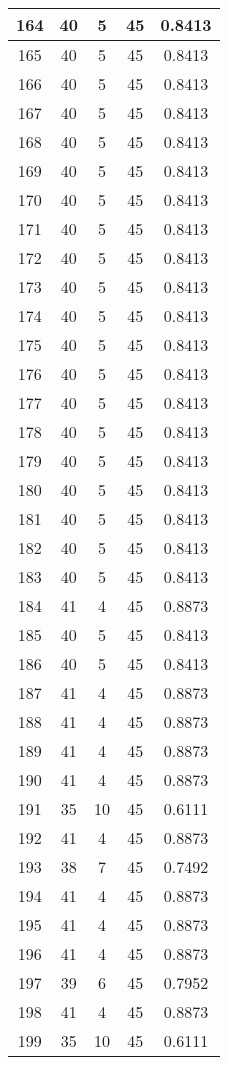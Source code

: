 \documentclass[letterpaper, 12pt]{article}
\begin{document}
\begin{longtable}{|c|c|c|c|c|}
\hline
164 & 40 & 5 & 45 & 0.8413 \\
\hline
165 & 40 & 5 & 45 & 0.8413 \\
\hline
166 & 40 & 5 & 45 & 0.8413 \\
\hline
167 & 40 & 5 & 45 & 0.8413 \\
\hline
168 & 40 & 5 & 45 & 0.8413 \\
\hline
169 & 40 & 5 & 45 & 0.8413 \\
\hline
170 & 40 & 5 & 45 & 0.8413 \\
\hline
171 & 40 & 5 & 45 & 0.8413 \\
\hline
172 & 40 & 5 & 45 & 0.8413 \\
\hline
173 & 40 & 5 & 45 & 0.8413 \\
\hline
174 & 40 & 5 & 45 & 0.8413 \\
\hline
175 & 40 & 5 & 45 & 0.8413 \\
\hline
176 & 40 & 5 & 45 & 0.8413 \\
\hline
177 & 40 & 5 & 45 & 0.8413 \\
\hline
178 & 40 & 5 & 45 & 0.8413 \\
\hline
179 & 40 & 5 & 45 & 0.8413 \\
\hline
180 & 40 & 5 & 45 & 0.8413 \\
\hline
181 & 40 & 5 & 45 & 0.8413 \\
\hline
182 & 40 & 5 & 45 & 0.8413 \\
\hline
183 & 40 & 5 & 45 & 0.8413 \\
\hline
184 & 41 & 4 & 45 & 0.8873 \\
\hline
185 & 40 & 5 & 45 & 0.8413 \\
\hline
186 & 40 & 5 & 45 & 0.8413 \\
\hline
187 & 41 & 4 & 45 & 0.8873 \\
\hline
188 & 41 & 4 & 45 & 0.8873 \\
\hline
189 & 41 & 4 & 45 & 0.8873 \\
\hline
190 & 41 & 4 & 45 & 0.8873 \\
\hline
191 & 35 & 10 & 45 & 0.6111 \\
\hline
192 & 41 & 4 & 45 & 0.8873 \\
\hline
193 & 38 & 7 & 45 & 0.7492 \\
\hline
194 & 41 & 4 & 45 & 0.8873 \\
\hline
195 & 41 & 4 & 45 & 0.8873 \\
\hline
196 & 41 & 4 & 45 & 0.8873 \\
\hline
197 & 39 & 6 & 45 & 0.7952 \\
\hline
198 & 41 & 4 & 45 & 0.8873 \\
\hline
199 & 35 & 10 & 45 & 0.6111 \\
\hline
\end{longtable}
\end{document}
